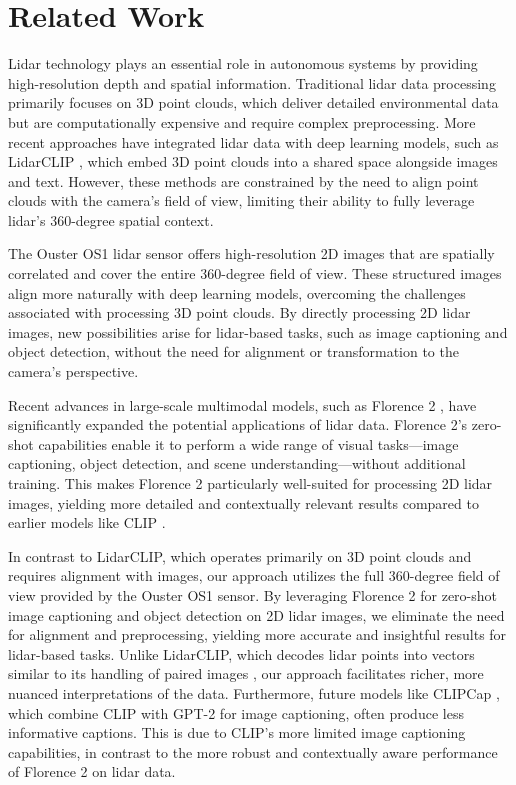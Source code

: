 \section{Related Work}
Lidar technology plays an essential role in autonomous systems by providing high-resolution depth and spatial information. Traditional lidar data processing primarily focuses on 3D point clouds, which deliver detailed environmental data but are computationally expensive and require complex preprocessing. More recent approaches have integrated lidar data with deep learning models, such as LidarCLIP \cite{hess2024lidarclip}, which embed 3D point clouds into a shared space alongside images and text. However, these methods are constrained by the need to align point clouds with the camera's field of view, limiting their ability to fully leverage lidar’s 360-degree spatial context.

The Ouster OS1 lidar sensor \cite{OusterOS1} offers high-resolution 2D images that are spatially correlated and cover the entire 360-degree field of view. These structured images align more naturally with deep learning models, overcoming the challenges associated with processing 3D point clouds. By directly processing 2D lidar images, new possibilities arise for lidar-based tasks, such as image captioning and object detection, without the need for alignment or transformation to the camera's perspective.

Recent advances in large-scale multimodal models, such as Florence 2 \cite{Xiao_2024_CVPR}, have significantly expanded the potential applications of lidar data. Florence 2’s zero-shot capabilities enable it to perform a wide range of visual tasks—image captioning, object detection, and scene understanding—without additional training. This makes Florence 2 particularly well-suited for processing 2D lidar images, yielding more detailed and contextually relevant results compared to earlier models like CLIP \cite{CLIP}.

In contrast to LidarCLIP, which operates primarily on 3D point clouds and requires alignment with images, our approach utilizes the full 360-degree field of view provided by the Ouster OS1 sensor. By leveraging Florence 2 for zero-shot image captioning and object detection on 2D lidar images, we eliminate the need for alignment and preprocessing, yielding more accurate and insightful results for lidar-based tasks. Unlike LidarCLIP, which decodes lidar points into vectors similar to its handling of paired images \cite{hess2024lidarclip}, our approach facilitates richer, more nuanced interpretations of the data. Furthermore, future models like CLIPCap \cite{mokady2021clipcapclipprefiximage}, which combine CLIP with GPT-2 \cite{GPT2} for image captioning, often produce less informative captions. This is due to CLIP's more limited image captioning capabilities, in contrast to the more robust and contextually aware performance of Florence 2 on lidar data.

